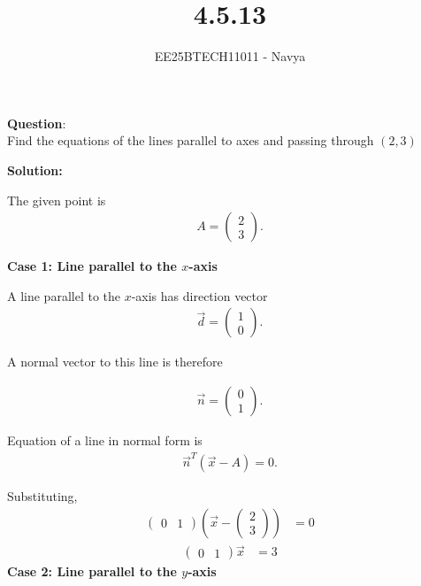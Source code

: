 \documentclass[journal]{IEEEtran}
\begin{document}

\vspace{3cm}

\title{4.5.13}
\author{EE25BTECH11011 - Navya}
{\let\newpage\relax\maketitle}

\renewcommand{\thefigure}{\theenumi}
\renewcommand{\thetable}{\theenumi}
\setlength{\intextsep}{10pt} %
\textbf{Question}:\\
Find the equations of the lines parallel to axes and passing through $(2, 3)$

\textbf{Solution:}  

The given point is  
\begin{align}
A = \begin{pmatrix}2 \\ 3\end{pmatrix}.
\end{align}


\textbf{Case 1: Line parallel to the $x$-axis}

 A line parallel to the $x$-axis has direction vector  
\begin{align}
\vec{d} = \begin{pmatrix}1 \\ 0\end{pmatrix}.
\end{align}

 A normal vector to this line is therefore  

\begin{align}
\vec{n} = \begin{pmatrix}0 \\ 1\end{pmatrix}.
\end{align}

Equation of a line in normal form is  
\begin{align}
\vec{n}^T(\vec{x} - A) = 0.
\end{align}

Substituting,
\begin{align}
\begin{pmatrix}0 & 1\end{pmatrix}
\left(\vec{x} - \begin{pmatrix}2 \\ 3\end{pmatrix}\right) &= 0
\end{align}
\begin{align}
\begin{pmatrix}0 & 1\end{pmatrix}\vec{x} &= 3
\end{align}
\textbf{Case 2: Line parallel to the $y$-axis}
\end{document}
